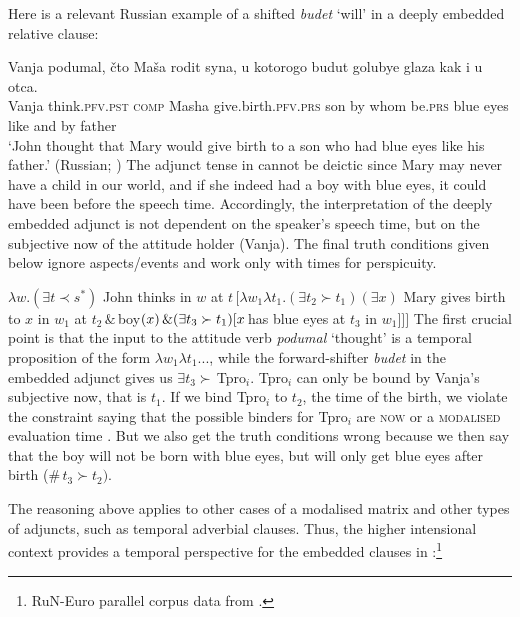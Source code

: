 \documentclass[output=paper,colorlinks,citecolor=brown]{langscibook}
\begin{document}
Here is a relevant Russian example of a shifted \textit{budet} `will' in a deeply embedded relative clause: 

\ea\label{ogir5}\gll Vanja podumal, čto Maša rodit syna, u kotorogo
budut golubye glaza kak i u otca.\\
Vanja think.\textsc{pfv}.\textsc{pst} \textsc{comp} Masha give.birth.\textsc{pfv}.\textsc{prs} son by whom be.\textsc{prs} blue eyes like and by father
\\ \glt
 `John thought that Mary would give birth to a son who had blue eyes like his father.' \hfill(Russian; \cite{gronn_stechow2012})
\z
The adjunct tense in  cannot be deictic since Mary may never have a child  in our world, and if she indeed had a boy with blue eyes, it could have been before the speech time. Accordingly,  the
interpretation of the deeply embedded adjunct is not dependent on the speaker’s speech
time, but on the subjective now of the attitude holder (Vanja). 
The final truth conditions given below
 ignore aspects/events and work only with times for perspicuity. 

\ea  $\lambda w.(\exists t \prec s^{*})$ John thinks in $w$ at $t \, [\lambda w_{1} \lambda t_{1}. (\exists t_{2} \succ t_{1})(\exists x)$ \newline {[}Mary gives birth to $x$ in $w_{1}$ at $t_{2} \, \& \, $boy$(x) \, \& \newline (\exists t_{3} \succ t_{1}) {[}x \, $has blue eyes at $t_{3}$ in $w_{1}]]]$
\z
The first crucial point is that the input to the attitude verb \textit{podumal} `thought' is a temporal proposition of the form $\lambda w_{1} \lambda t_{1}...$, while the forward-shifter \textit{budet} in the embedded adjunct gives us  $\exists t_{3} \succ \, $Tpro$_{i}$. Tpro$_{i}$ can only be bound by Vanja's subjective now, that is $t_{1}$. If we bind Tpro$_{i}$ to $t_{2}$, the time of the birth, we violate the constraint saying that the possible binders for Tpro$_{i}$ are \textsc{now} or a \textsc{modalised} evaluation time \citep{gronn24}. But we also get the truth conditions wrong because we then say that the boy will not be born with blue eyes, but will only get  blue eyes after birth (\#$\, t_{3} \succ t_{2})$.


The reasoning above applies to other cases of a modalised matrix and other types of adjuncts, such as temporal adverbial clauses.
Thus, the higher intensional context provides a temporal perspective for the embedded clauses in :\footnote{RuN-Euro parallel corpus data  from \citet{gronn_stechow2012}.} 
\end{document}
